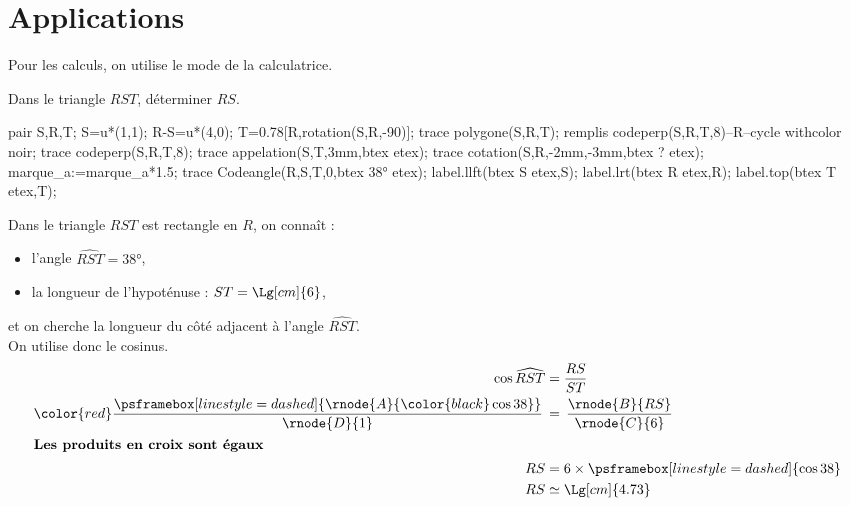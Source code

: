 \section{Applications}
\begin{remarque}
    Pour les calculs, on utilise le mode \fg{} de la calculatrice.
\end{remarque}

\begin{methode}
    \exercice    
    Dans le triangle $RST$, déterminer $RS$.\\
    \begin{Geometrie}[CoinHD={(6u,4.5u)}]        
        pair S,R,T;
        S=u*(1,1);
        R-S=u*(4,0);
        T=0.78[R,rotation(S,R,-90)];
        trace polygone(S,R,T);
        remplis codeperp(S,R,T,8)--R--cycle withcolor noir;
        trace codeperp(S,R,T,8);
        trace appelation(S,T,3mm,btex  etex);        
        trace cotation(S,R,-2mm,-3mm,btex ? etex);
        marque_a:=marque_a*1.5;
        trace Codeangle(R,S,T,0,btex \ang{38} etex);
        label.llft(btex S etex,S);
        label.lrt(btex R etex,R);
        label.top(btex T etex,T);
    \end{Geometrie}
    \correction
    Dans le triangle $RST$ est rectangle en $R$, on connaît :
    \begin{itemize}
        \item l'angle $\widehat{RST}=\ang{38}$,
        \item la longueur de l'hypoténuse : $ST=\Lg[cm]{6}$,
    \end{itemize}
    et on cherche la longueur du côté adjacent à l'angle $\widehat{RST}$.\\
    On utilise donc le cosinus.
    \begin{align*}
        \cos\widehat{RST}&=\frac{RS}{ST}\\
        {\color{red}\frac{\psframebox[linestyle=dashed]{\rnode{A}{\color{black}\cos38}}}{\rnode{D}{1}}}\,&=\,\frac{\rnode{B}{RS}}{\rnode{C}{6}}\\    
        \intertext{\centering\bf Les produits en croix sont égaux}
        RS&=6\times\psframebox[linestyle=dashed]{\cos38}\\
        RS&\simeq\Lg[cm]{4.73}
    \end{align*}
\end{methode}

